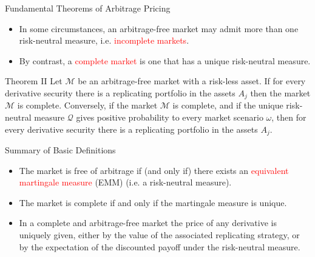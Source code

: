 \documentclass{beamer}
\begin{document}
\begin{frame}{Fundamental Theorems of Arbitrage Pricing}
	\begin{itemize}
		\item In some circumstances, an arbitrage-free market may admit more than one risk-neutral measure, i.e. \textcolor{red}{incomplete markets}.
		\item By contrast, a \textcolor{red}{complete market} is one that has a unique risk-neutral measure.
	\end{itemize}
	\pause
	\begin{block}{Theorem II}
		Let $\mathcal{M}$ be an arbitrage-free market with a risk-less asset. If for every derivative security there is a replicating portfolio in the assets $A_j$ then the market $\mathcal{M}$ is complete. Conversely, if the market $\mathcal{M}$ is complete, and if the unique risk-neutral measure $\mathcal{Q}$ gives positive probability to every market scenario $\omega$, then for every
		derivative security there is a replicating portfolio in the assets $A_j$.
	\end{block}
\end{frame}

\begin{frame}{Summary of Basic Definitions}
	\begin{itemize}
		\item The market is free of arbitrage if (and only if) there exists an \textcolor{red}{equivalent martingale measure} (EMM) (i.e. a risk-neutral measure).
		\item The market is complete if and only if the martingale measure is unique.
		\item In a complete and arbitrage-free market the price of any derivative is uniquely given, either by the value of the associated replicating strategy, or by the expectation of the discounted payoff under the risk-neutral measure. 
	\end{itemize}
\end{frame}
\end{document}
